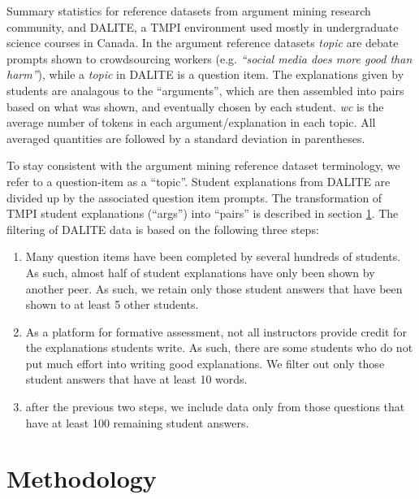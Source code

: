 \documentclass[notitlepage,12pt]{jedm}
\begin{document}
\begin{table}
	
	\caption{
		Summary statistics for reference datasets from argument mining research 
		community, and DALITE, a TMPI environment used mostly in undergraduate 
		science courses in Canada. 
		In the argument reference datasets \textit{topic} are debate prompts 
		shown to crowdsourcing workers (e.g. \textit{``social media does more 
		good than harm''}), while a \textit{topic} in DALITE is a question item.
		The explanations given by students are analagous to the ``arguments'',  
		which are then assembled into pairs based on what was shown, and 
		eventually chosen by each student.
		\textit{wc} is the average number of tokens in each 
		argument/explanation in each topic.
		All averaged quantities are followed by a standard deviation in 
		parentheses.
	}
	\label{tab:data_summary}
\end{table}

To stay consistent with the argument mining reference dataset terminology, we 
refer to a question-item as a ``topic''.
Student explanations from DALITE are divided up by the associated question item 
prompts.
The transformation of TMPI student explanations (``args'') into ``pairs'' is 
described in section \ref{sec:methodology}. 
The filtering of DALITE data is based on the following three steps:
\begin{enumerate}
	\item Many question items have been completed by several hundreds of 
	students. 
	As such, almost half of student explanations have only been shown by 
	another peer. 
	As such, we retain only those student answers that have been shown to at 
	least 5 other students.
	\item As a platform for formative assessment, not all instructors provide 
	credit for the explanations students write.
	As such, there are some students who do not put much effort into writing 
	good explanations.
	We filter out only those student answers that have at least 10 words.
	\item after the previous two steps, we include data only from those 
	questions that have at least 100 remaining student answers.
\end{enumerate}



\section{Methodology}\label{sec:methodology}
\end{document}
